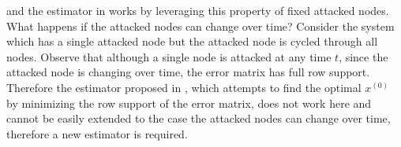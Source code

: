 \documentclass[twocolumn]{autart}    %
\newcommand{\rev}[1]{{\normalsize{{{\color{blue}#1}}}}}
\begin{document}
and the \rev{estimator} in \cite{Fawzi2014} works by leveraging this property of fixed attacked nodes. \\
What happens if the attacked nodes can change over time? Consider the system \rev{which} has a single attacked node but the attacked node is cycled through all nodes. 
\rev{Observe that although a single node is attacked at any time $t$, since the attacked node is changing over time, the error matrix has full row support. Therefore the \rev{estimator} proposed in \cite{Fawzi2014}, which attempts to find the optimal $x^{(0)}$ by minimizing the row support of the error matrix, does not work here and cannot be easily extended to the case the attacked nodes can change over time, therefore a new estimator is required.} 
\end{document}
